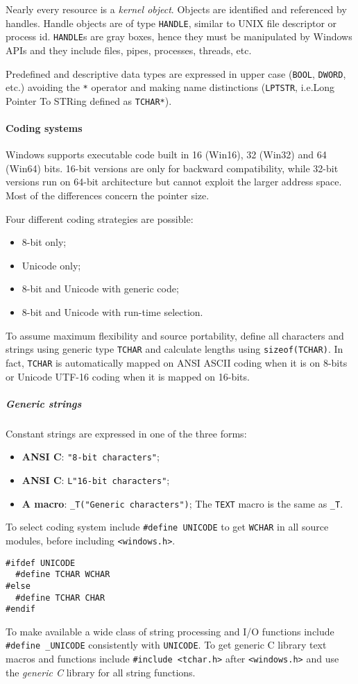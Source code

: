 Nearly every resource is a \emph{kernel object}. Objects are identified and referenced by handles. Handle objects are of type \texttt{HANDLE}, similar to UNIX file descriptor or process id. \texttt{HANDLE}s are gray boxes, hence they must be manipulated by Windows APIs and they include files, pipes, processes, threads, etc.

Predefined and descriptive data types are expressed in upper case (\texttt{BOOL}, \texttt{DWORD}, etc.) avoiding the \texttt{*} operator and making name distinctions (\texttt{LPTSTR}, i.e.\@ Long Pointer To STRing defined as \texttt{TCHAR*}).

\paragraph{Coding systems}
Windows supports executable code built in 16 (Win16), 32 (Win32) and 64 (Win64) bits. 16-bit versions are only for backward compatibility, while 32-bit versions run on 64-bit architecture but cannot exploit the larger address space. Most of the differences concern the pointer size. 

Four different coding strategies are possible:
\begin{itemize}
\item 8-bit only;
\item Unicode only;
\item 8-bit and Unicode with generic code;
\item 8-bit and Unicode with run-time selection.
\end{itemize}
To assume maximum flexibility and source portability, define all characters and strings using generic type \texttt{TCHAR} and calculate lengths using \texttt{sizeof(TCHAR)}. In fact, \texttt{TCHAR} is automatically mapped on ANSI ASCII coding when it is on 8-bits or Unicode UTF-16 coding when it is mapped on 16-bits.

\subparagraph{Generic strings}
Constant strings are expressed in one of the three forms:
\begin{itemize}
\item \textbf{ANSI C}: \texttt{"8-bit characters"};
\item \textbf{ANSI C}: \texttt{L"16-bit characters"};
\item \textbf{A macro}: \texttt{\_T("Generic characters")}; The \texttt{TEXT} macro is the same as \texttt{\_T}.
\end{itemize}

To select coding system include \texttt{\#define UNICODE} to get \texttt{WCHAR} in all source modules, before including \texttt{<windows.h>}.
\begin{verbatim}
#ifdef UNICODE
  #define TCHAR WCHAR
#else
  #define TCHAR CHAR
#endif
\end{verbatim}
To make available a wide class of string processing and I/O functions include \texttt{\#define \_UNICODE} consistently with \texttt{UNICODE}. To get generic C library text macros and functions include \texttt{\#include <tchar.h>} after \texttt{<windows.h>} and use the \emph{generic C} library for all string functions.

